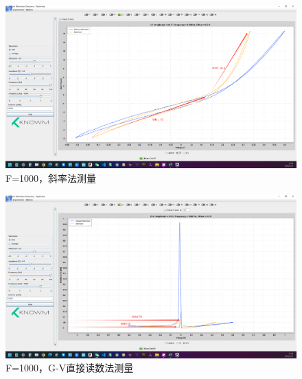 \documentclass[12pt,hyperref,a4paper,UTF8]{ctexart}
\begin{document}
\begin{figure}[H]
    \centering
    \begin{minipage}{1\textwidth}
        \centering
        \includegraphics[width=1\textwidth]{figures/F10001D.png}
        \caption{F=1000，斜率法测量}
        \label{fig:F1000_slope_method}
    \end{minipage}
\end{figure}

\begin{figure}[H]
    \centering
    \begin{minipage}{1\textwidth}
        \centering
        \includegraphics[width=1\textwidth]{figures/F10002D.png}
        \caption{F=1000，G-V直接读数法测量}
        \label{fig:F1000_GV_method}
    \end{minipage}
\end{figure}
\end{document}
